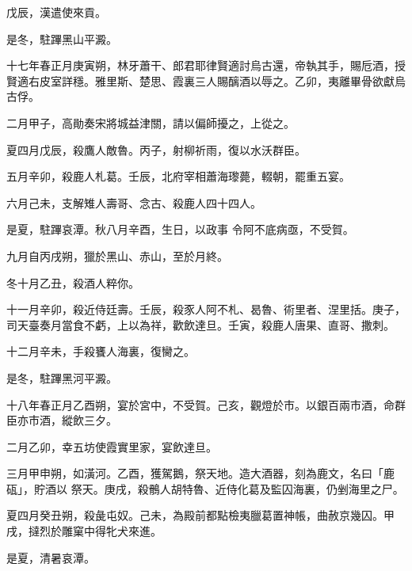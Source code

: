 \begin{pinyinscope}
 戊辰，漢遣使來貢。



 是冬，駐蹕黑山平澱。



 十七年春正月庚寅朔，林牙蕭干、郎君耶律賢適討烏古還，帝執其手，賜卮酒，授賢適右皮室詳穩。雅里斯、楚思、霞裏三人賜醨酒以辱之。乙卯，夷離畢骨欲獻烏古俘。



 二月甲子，高勛奏宋將城益津關，請以偏師擾之，上從之。



 夏四月戊辰，殺鷹人敵魯。丙子，射柳祈雨，復以水沃群臣。



 五月辛卯，殺鹿人札葛。壬辰，北府宰相蕭海瓈薨，輟朝，罷重五宴。



 六月己未，支解雉人壽哥、念古、殺鹿人四十四人。



 是夏，駐蹕哀潭。秋八月辛酉，生日，以政事
 令阿不底病亟，不受賀。



 九月自丙戌朔，獵於黑山、赤山，至於月終。



 冬十月乙丑，殺酒人粹你。



 十一月辛卯，殺近侍廷壽。壬辰，殺豕人阿不札、曷魯、術里者、涅里括。庚子，司天臺奏月當食不虧，上以為祥，歡飲達旦。壬寅，殺鹿人唐果、直哥、撒刺。



 十二月辛未，手殺饔人海裏，復臠之。



 是冬，駐蹕黑河平澱。



 十八年春正月乙酉朔，宴於宮中，不受賀。己亥，觀燈於市。以銀百兩市酒，命群臣亦市酒，縱飲三夕。



 二月乙卯，幸五坊使霞實里家，宴飲達旦。



 三月甲申朔，如潢河。乙酉，獲駕鵝，祭天地。造大酒器，刻為鹿文，名曰「鹿砙」，貯酒以
 祭天。庚戌，殺鶻人胡特魯、近侍化葛及監囚海裏，仍剉海里之尸。



 夏四月癸丑朔，殺彘屯奴。己未，為殿前都點檢夷臘葛置神帳，曲赦京幾囚。甲戌，撻烈於雕窠中得牝犬來進。



 是夏，清暑哀潭。




\end{pinyinscope}
